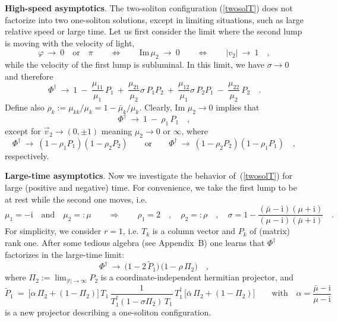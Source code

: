 \documentclass[a4paper,11pt]{article}
\numberwithin{equation}{section}
\def\a{\alpha}
\def\s{\sigma}
\def\i{\mbox{i}}
\newcommand{\Tdag}{T^{\dagger}}
\newcommand{\Pt}{\widetilde{P}}
\begin{document}
\noindent
{\bf High-speed asymptotics}.
The two-soliton configuration (\ref{twosolT}) does not factorize into
two one-soliton solutions, except in limiting situations,
such as large relative speed or large time.
Let us first consider the limit where the second lump
is moving with the velocity of light,
\begin{equation}
\varphi\ \to\ 0\quad\textrm{or}\quad\pi
\qquad\Longleftrightarrow\qquad
\textrm{Im}\,\mu_2\ \to\ 0
\qquad\Longleftrightarrow\qquad
|v_2|\ \to\ 1 \quad,
\end{equation}
while the velocity of the first lump is subluminal.
In this limit, we have $\s\to0$ and therefore
\begin{equation}
\Phi^\dagger\ \to\ 1\ -\
\frac{\mu_{11}}{\mu_1}\,P_1\ +\
\frac{\mu_{21}}{\mu_2}\s\,P_1 P_2\ +\
\frac{\mu_{12}}{\mu_1}\s\,P_2 P_1\ -\
\frac{\mu_{22}}{\mu_2}\,P_2 \quad.
\end{equation}
Define also $\rho_k:=\mu_{kk}/\mu_k=1{-}\bar{\mu}_k/\mu_k$.
Clearly, Im $\mu_2\to0$ implies that
\begin{equation}
\Phi^\dagger\ \to\ 1\ -\ \rho_1\,P_1 \quad,
\end{equation}
except for $\vec v_2\to(0,\pm1)$ meaning $\mu_2\to0$ or $\infty$, where
\begin{equation}
\Phi^\dagger\ \to\ (1 - \rho_1 P_1) (1 - \rho_2 P_2) \qquad\textrm{or}\qquad
\Phi^\dagger\ \to\ (1 - \rho_2 P_2) (1 - \rho_1 P_1) \quad,
\end{equation}
respectively.

\noindent
{\bf Large-time asymptotics}.
Now we investigate the behavior of~(\ref{twosolT}) for large (positive
and negative) time. For convenience, we take the first lump to be at rest
while the second one moves, i.e.
\begin{equation} \label{specialmu}
\mu_1=-\i \quad\textrm{and}\quad \mu_2=:\mu
\qquad\Longrightarrow\qquad
\rho_1=2 \quad,\quad \rho_2=:\rho \quad,\quad
\s=1-\frac{(\bar{\mu}-\i)(\mu+\i)}{(\mu-\i)(\bar{\mu}+\i)} \quad.
\end{equation}
For simplicity, we consider $r{=}1$, i.e. $T_k$ is a column vector
and $P_k$ of (matrix) rank one.
After some tedious algebra (see Appendix~B) one learns that $\Phi^\dagger$
factorizes in the large-time limit:
\begin{equation} \label{larget}
\Phi^{\dagger}\ \to\ \bigl(1-2\,\Pt_1\bigr)\,\bigl(1-\rho\,\Pi_2\bigr) \quad,
\end{equation}
where $\Pi_2:=\lim_{|t|\to\infty}P_2$ is a coordinate-independent hermitian
projector, and
\begin{equation}
\Pt_1\ =\ \bigl[\a\,\Pi_2+(1{-}\Pi_2)\bigr]\,
T_1\,\frac{1}{\Tdag_1(1{-}\s\Pi_2)\,T_1}\,\Tdag_1\,
\bigl[\bar{\a}\,\Pi_2+(1{-}\Pi_2)\bigr]
\qquad\textrm{with}\quad \a=\frac{\bar{\mu}-\i}{\mu-\i}
\end{equation}
is a new projector describing a one-soliton configuration.
\end{document}
